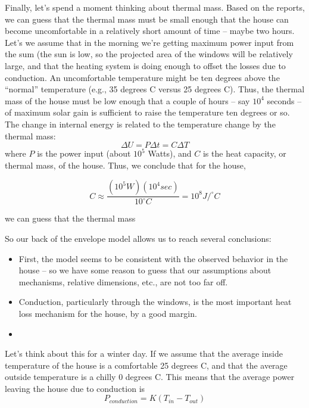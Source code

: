 \documentclass[10pt]{book}
\begin{document}
Finally, let's spend a moment thinking about thermal mass.  Based on the reports, we can guess that the thermal mass must be small enough that the house can become uncomfortable in a relatively short amount of time -- maybe two hours.  Let's we assume that in the morning we're getting maximum power input from the sum (the sun is low, so the projected area of the windows will be relatively large, and that the heating system is doing enough to offset the losses due to conduction.  An uncomfortable temperature might be ten degrees above the ``normal'' temperature (e.g., 35 degrees C versus 25 degrees C).  Thus, the thermal mass of the house must be low enough that a couple of hours -- say $10^4$ seconds --  of maximum solar gain is sufficient to raise the temperature ten degrees or so.  The change in internal energy is related to the temperature change by the thermal mass:
$$ \Delta U = P \Delta t = C\Delta T$$
where $P$ is the power input (about $10^5$ Watts), and $C$ is the heat capacity, or thermal mass, of the house.  Thus, we conclude that for the house,

$$C \approx \frac{(10^5 W)(10^4 sec)}{10^{\circ} C} = 10^8 J/^\circ C$$ 

  

we can guess that the thermal mass

So our back of the envelope model allows us to reach several conclusions:
\begin{itemize}
\item First, the model seems to be consistent with the observed behavior in the house -- so we have some reason to guess that our assumptions about mechanisms, relative dimensions, etc., are not too far off.
\item Conduction, particularly through the windows, is the most important heat loss mechanism for the house, by a good margin.
\item 

\end{itemize}




Let's think about this for a winter day.  If we assume that the average inside temperature of the house is a comfortable 25 degrees C, and that the average outside temperature is  a chilly 0 degrees C.  This means that the average power leaving the house due to conduction is 
$$P_{conduction} = K (T_{in} - T_{out})$$
\end{document}

